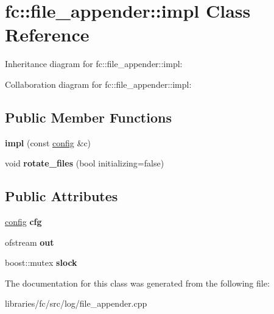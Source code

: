 \hypertarget{classfc_1_1file__appender_1_1impl}{}\section{fc\+:\+:file\+\_\+appender\+:\+:impl Class Reference}
\label{classfc_1_1file__appender_1_1impl}


Inheritance diagram for fc\+:\+:file\+\_\+appender\+:\+:impl\+:


Collaboration diagram for fc\+:\+:file\+\_\+appender\+:\+:impl\+:
\subsection*{Public Member Functions}
\begin{DoxyCompactItemize}
\item 
\mbox{\label{classfc_1_1file__appender_1_1impl_a8395957b498a9256f5f22f35092b81ba}} 
{\bfseries impl} (const \mbox{\hyperlink{structfc_1_1file__appender_1_1config}{config}} \&c)
\item 
\mbox{\label{classfc_1_1file__appender_1_1impl_a80c2b12a1b539e2449a24cb2abc1b856}} 
void {\bfseries rotate\+\_\+files} (bool initializing=false)
\end{DoxyCompactItemize}
\subsection*{Public Attributes}
\begin{DoxyCompactItemize}
\item 
\mbox{\label{classfc_1_1file__appender_1_1impl_a4dbc2161ba39ea507e97276ce96c841b}} 
\mbox{\hyperlink{structfc_1_1file__appender_1_1config}{config}} {\bfseries cfg}
\item 
\mbox{\label{classfc_1_1file__appender_1_1impl_aec4dd551509e87455254409bc658ca56}} 
ofstream {\bfseries out}
\item 
\mbox{\label{classfc_1_1file__appender_1_1impl_ae659ea7d03512cc07ce4cd3f243fcad1}} 
boost\+::mutex {\bfseries slock}
\end{DoxyCompactItemize}


The documentation for this class was generated from the following file\+:\begin{DoxyCompactItemize}
\item 
libraries/fc/src/log/file\+\_\+appender.\+cpp\end{DoxyCompactItemize}
